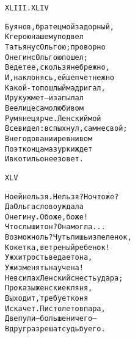 \begin{minipage}[t]{\dimexpr 0.5\textwidth -\tabcolsep-.5pt}
\begin{alltt}\normalfont\centering
XLIII. XLIV

Буянов, братец мой задорный,
К герою нашему подвел
Татьяну с Ольгою; проворно
Онегин с Ольгою пошел;
Ведет ее, скользя небрежно,
И, наклонясь, ей шепчет нежно
Какой-то пошлый мадригал,
И руку жмет — и запылал
В ее лице самолюбивом
Румянец ярче. Ленский мой
Все видел: вспыхнул, сам не свой;
В негодовании ревнивом
Поэт конца мазурки ждет
И в котильон ее зовет.
\end{alltt}
\end{minipage}

\begin{minipage}[t]{\dimexpr 0.5\textwidth -\tabcolsep-.5pt}
\begin{alltt}\normalfont\centering
XLV

Но ей нельзя. Нельзя? Но что же?
Да Ольга слово уж дала
Онегину. О боже, боже!
Что слышит он? Она могла...
Возможно ль? Чуть лишь из пеленок,
Кокетка, ветреный ребенок!
Уж хитрость ведает она,
Уж изменять научена!
Не в силах Ленский снесть удара;
Проказы женские кляня,
Выходит, требует коня
И скачет. Пистолетов пара,
Две пули — больше ничего —
Вдруг разрешат судьбу его.
\end{alltt}
\end{minipage}
\clearpage
